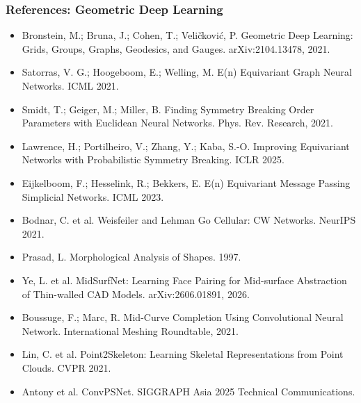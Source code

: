 \begin{frame}\frametitle{References: Geometric Deep Learning}
\footnotesize
\begin{itemize}
\item Bronstein, M.; Bruna, J.; Cohen, T.; Veli\v{c}kovi\'{c}, P. Geometric Deep Learning: Grids, Groups, Graphs, Geodesics, and Gauges. arXiv:2104.13478, 2021.
\item Satorras, V. G.; Hoogeboom, E.; Welling, M. E(n) Equivariant Graph Neural Networks. ICML 2021.
\item Smidt, T.; Geiger, M.; Miller, B. Finding Symmetry Breaking Order Parameters with Euclidean Neural Networks. Phys. Rev. Research, 2021.
\item Lawrence, H.; Portilheiro, V.; Zhang, Y.; Kaba, S.-O. Improving Equivariant Networks with Probabilistic Symmetry Breaking. ICLR 2025.
\item Eijkelboom, F.; Hesselink, R.; Bekkers, E. E(n) Equivariant Message Passing Simplicial Networks. ICML 2023.
\item Bodnar, C. et al. Weisfeiler and Lehman Go Cellular: CW Networks. NeurIPS 2021.
\item Prasad, L. Morphological Analysis of Shapes. 1997.
\item Ye, L. et al. MidSurfNet: Learning Face Pairing for Mid-surface Abstraction of Thin-walled CAD Models. arXiv:2606.01891, 2026.
\item Boussuge, F.; Marc, R. Mid-Curve Completion Using Convolutional Neural Network. International Meshing Roundtable, 2021.
\item Lin, C. et al. Point2Skeleton: Learning Skeletal Representations from Point Clouds. CVPR 2021.
\item Antony et al. ConvPSNet. SIGGRAPH Asia 2025 Technical Communications.
\end{itemize}
\end{frame}
